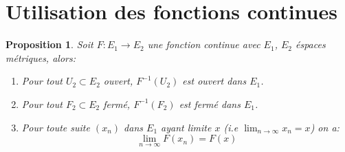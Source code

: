 \documentclass[a4paper]{article}
\newtheorem{proposition}{Proposition}[section]
\begin{document}
\section{Utilisation des fonctions continues}
\begin{proposition}
   Soit $F: E_1 \to  E_2$ une fonction continue avec $E_1$, $E_2$ éspaces métriques, alors:
   \begin{enumerate}
       \item Pour tout $U_2 \subset E_2$ ouvert, $F^{-1}(U_2)$ est ouvert dans $E_1$.
       \item Pour tout $F_2 \subset E_2$ fermé, $F^{-1}(F_2)$ est fermé dans $E_1$. 
       \item Pour toute suite $(x_n)$ dans  $E_1$ ayant limite $x$ (i.e $\lim_{n \to \infty} x_n = x$) on a:
           \[
           \lim_{n \to \infty} F(x_n) = F(x)
           \] 
   \end{enumerate}
\end{proposition}
\end{document}
